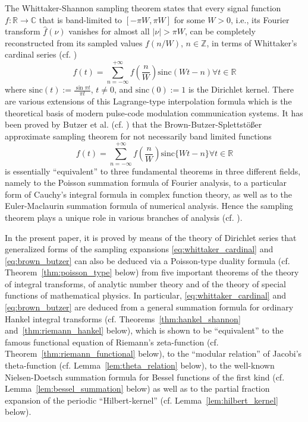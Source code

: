 \documentclass{article}
\newcommand{\assign}{:=}
\begin{document}
The Whittaker-Shannon sampling theorem states that every signal function $f :
\mathbb{R} \to \mathbb{C}$ that is band-limited to $[- \pi W, \pi W]$ for some
$W > 0$, i.e., its Fourier transform $\hat{f} (\nu)$ vanishes for almost all
$| \nu | > \pi W$, can be completely reconstructed from its sampled values $f
(n / W)$, $n \in \mathbb{Z}$, in terms of Whittaker's cardinal series (cf.
{\cite{28,32}})
\begin{equation}
  f (t) = \sum_{n = - \infty}^{+ \infty} f \left( \frac{n}{W} \right)
  \mathrm{sinc} (Wt - n) \forall t \in \mathbb{R}
  \label{eq:whittaker_cardinal}
\end{equation}
where $\mathrm{sinc} (t) \assign \frac{\sin \pi t}{\pi t}$, $t \neq 0$, and
$\mathrm{sinc} (0) \assign 1$ is the Dirichlet kernel. There are various
extensions of this Lagrange-type interpolation formula which is the
theoretical basis of modern pulse-code modulation communication systems. It
has been proved by Butzer et al. (cf. {\cite{7,8,9,10}}) that the
Brown-Butzer-Splettst{\"o}{\ss}er approximate sampling theorem for not
necessarily band limited functions
\begin{equation}
  f (t) = \sum_{n = - \infty}^{+ \infty} f \left( \frac{n}{W} \right)
  \mathrm{sinc} \{Wt - n\} \forall t \in \mathbb{R} \label{eq:brown_butzer}
\end{equation}
is essentially ``equivalent'' to three fundamental theorems in three different
fields, namely to the Poisson summation formula of Fourier analysis, to a
particular form of Cauchy's integral formula in complex function theory, as
well as to the Euler-Maclaurin summation formula of numerical analysis. Hence
the sampling theorem plays a unique role in various branches of analysis (cf.
{\cite{5}}).

In the present paper, it is proved by means of the theory of Dirichlet series
that generalized forms of the sampling expansions
\eqref{eq:whittaker_cardinal} and \eqref{eq:brown_butzer} can also be deduced
via a Poisson-type duality formula (cf. Theorem~\ref{thm:poisson_type} below)
from five important theorems of the theory of integral transforms, of analytic
number theory and of the theory of special functions of mathematical physics.
In particular, \eqref{eq:whittaker_cardinal} and \eqref{eq:brown_butzer} are
deduced from a general summation formula for ordinary Hankel integral
transforms (cf. Theorems~\ref{thm:hankel_shannon} and~\ref{thm:riemann_hankel}
below), which is shown to be ``equivalent'' to the famous functional equation
of Riemann's zeta-function (cf. Theorem~\ref{thm:riemann_functional} below),
to the ``modular relation'' of Jacobi's theta-function (cf.
Lemma~\ref{lem:theta_relation} below), to the well-known Nielsen-Doetsch
summation formula for Bessel functions of the first kind (cf.
Lemma~\ref{lem:bessel_summation} below) as well as to the partial fraction
expansion of the periodic ``Hilbert-kernel'' (cf.
Lemma~\ref{lem:hilbert_kernel} below).
\end{document}
